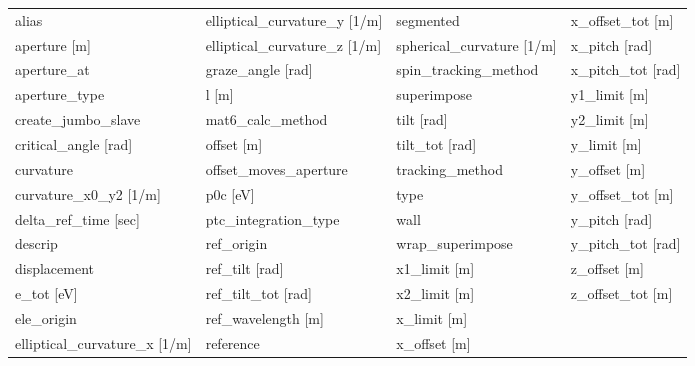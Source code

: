  \begin{tabular}{llll} \toprule
alias                            & elliptical_curvature_y [1/m]     & segmented                        & x_offset_tot [m]                 \\
aperture [m]                     & elliptical_curvature_z [1/m]     & spherical_curvature [1/m]        & x_pitch [rad]                    \\
aperture_at                      & graze_angle [rad]                & spin_tracking_method             & x_pitch_tot [rad]                \\
aperture_type                    & l [m]                            & superimpose                      & y1_limit [m]                     \\
create_jumbo_slave               & mat6_calc_method                 & tilt [rad]                       & y2_limit [m]                     \\
critical_angle [rad]             & offset [m]                       & tilt_tot [rad]                   & y_limit [m]                      \\
curvature                        & offset_moves_aperture            & tracking_method                  & y_offset [m]                     \\
curvature_x0_y2 [1/m]            & p0c [eV]                         & type                             & y_offset_tot [m]                 \\
delta_ref_time [sec]             & ptc_integration_type             & wall                             & y_pitch [rad]                    \\
descrip                          & ref_origin                       & wrap_superimpose                 & y_pitch_tot [rad]                \\
displacement                     & ref_tilt [rad]                   & x1_limit [m]                     & z_offset [m]                     \\
e_tot [eV]                       & ref_tilt_tot [rad]               & x2_limit [m]                     & z_offset_tot [m]                 \\
ele_origin                       & ref_wavelength [m]               & x_limit [m]                      &                                  \\
elliptical_curvature_x [1/m]     & reference                        & x_offset [m]                     &                                  \\
 \bottomrule
 \end{tabular}
 \vfill
 
